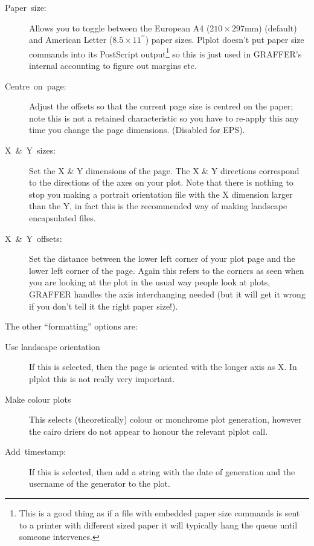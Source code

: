 \documentclass[11pt,twoside,english]{article}
\begin{document}
 \begin{description}
 \item [Paper~size:]Allows you to toggle between the European A4
   ($210\times297\mathrm{mm}$) (default) and American Letter
   ($8.5\times11^{\prime\prime}$) paper sizes. Plplot doesn't put paper
   size commands into its PostScript output\footnote{This is a good
     thing as if a file with embedded paper size commands is sent to a
     printer with different sized paper it will typically hang the
     queue until someone intervenes.} so this is just used in GRAFFER's
   internal accounting to figure out margins etc.
 \item [Centre~on~page:]Adjust the offsets so that the current page
   size is centred on the paper; note this is not a retained
   characteristic so you have to re-apply this any time you change the
   page dimensions. (Disabled for EPS).
 \item [X~\&~Y~sizes:]Set the X \& Y dimensions of the page. The X \& Y
   directions correspond to the directions of the axes on your plot.
   Note that there is nothing to stop you making a portrait orientation
   file with the X dimension larger than the Y, in fact this is the
   recommended way of making landscape encapsulated files.
 \item [X~\&~Y~offsets:]Set the distance between the lower left corner
   of your plot page and the lower left corner of the page. Again this
   refers to the corners as seen when you are looking at the plot in
   the usual way people look at plots, GRAFFER handles the axis
   interchanging needed (but it will get it wrong if you don't tell it
   the right paper size!).
 \end{description}

 The other {}``formatting'' options are:

 \begin{description}
 \item[Use landscape orientation] If this is selected, then the page is
   oriented with the longer axis as X. In plplot this is not really
   very important.
 \item[Make colour plots] This selects (theoretically) colour or
   monchrome plot generation, however the cairo driers do not appear to
   honour the relevant plplot call.
 \item [Add~timestamp:]If this is selected, then add a string with the
   date of generation and the username of the generator to the plot.
 \end{description}
\end{document}

